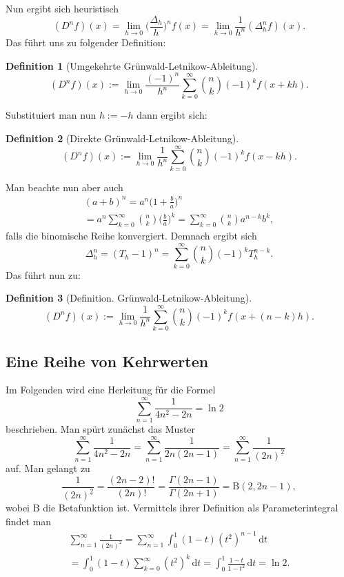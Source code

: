 \documentclass[a4paper,10pt,fleqn,twocolumn,twoside,dvipdfmx]{scrartcl}
\numberwithin{equation}{section}
\theoremstyle{rmbox}
\newtheorem{definition}{Definition}
\begin{document}
Nun ergibt sich heuristisch
\begin{equation}
(D^n f)(x) = \lim_{h\to 0} \bigg(\frac{\Delta_h}{h}\bigg)^n f(x)
= \lim_{h\to 0}\frac{1}{h^n} (\Delta_h^n f)(x).
\end{equation}
Das führt uns zu folgender Definition:
\begin{definition}[Umgekehrte Grünwald-Letnikow-Ableitung]
\begin{equation}
(D^n f)(x) := \lim_{h\to 0}
\frac{(-1)^n}{h^n} \sum_{k=0}^\infty \binom{n}{k} (-1)^k f(x+kh).
\end{equation}
\end{definition}
Substituiert man nun $h:=-h$ dann ergibt sich:
\begin{definition}[Direkte Grünwald-Letnikow-Ableitung]
\begin{equation}
(D^n f)(x) := \lim_{h\to 0}
\frac{1}{h^n} \sum_{k=0}^\infty \binom{n}{k} (-1)^k f(x-kh).
\end{equation}
\end{definition}
Man beachte nun aber auch
\begin{gather}
(a+b)^n = a^n \bigg(1+\frac{b}{a}\bigg)^n\\
= a^n\sum_{k=0}^\infty \binom{n}{k}\bigg(\frac{b}{a}\bigg)^k
= \sum_{k=0}^\infty \binom{n}{k} a^{n-k}b^k,
\end{gather}
falls die binomische Reihe konvergiert. Demnach ergibt sich%
\begin{equation}
\Delta_h^n = (T_h-1)^n = \sum_{k=0}^\infty \binom{n}{k}(-1)^k T_h^{n-k}.
\end{equation}
Das führt nun zu:
\begin{definition}[Definition. Grünwald-Letnikow-Ableitung]
\begin{equation}
(D^n f)(x) := \lim_{h\to 0}
\frac{1}{h^n} \sum_{k=0}^\infty \binom{n}{k} (-1)^k f(x+(n-k)h).
\end{equation}
\end{definition}

\subsection{Eine Reihe von Kehrwerten}

Im Folgenden wird eine Herleitung für die Formel
\begin{equation}
\sum_{n=1}^\infty \frac{1}{4n^2-2n} = \ln 2
\end{equation}
beschrieben. Man spürt zunächst das Muster
\[\sum_{n=1}^\infty \frac{1}{4n^2-2n} =
\sum_{n=1}^\infty \frac{1}{2n(2n-1)} = \sum_{n=1}^\infty \frac{1}{(2n)^{\underline 2}}\]
auf. Man gelangt zu
\[\frac{1}{(2n)^{\underline 2}} = \frac{(2n-2)!}{(2n)!}
= \frac{\Gamma(2n-1)}{\Gamma(2n+1)} = \mathrm B(2,2n-1),\]
wobei $\mathrm B$ die Betafunktion ist. Vermittels ihrer Definition
als Parameterintegral findet man
\begin{gather*}
\sum_{n=1}^\infty \frac{1}{(2n)^{\underline 2}}
= \sum_{n=1}^\infty\int_0^1 (1-t)(t^2)^{n-1}\,\mathrm dt\\
= \int_0^1 (1-t)\sum_{k=0}^\infty (t^2)^k\,\mathrm dt
= \int_0^1 \frac{1-t}{1-t^2}\,\mathrm dt = \ln 2.
\end{gather*}
\end{document}
